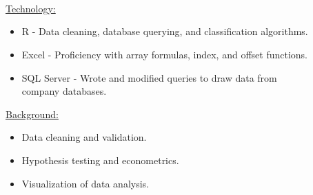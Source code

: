 \documentclass{res}
\begin{document}
\begin{resume}
\\



\\
\vspace{-5 pt}\\
\begin{minipage}{.5\textwidth} \normalsize{ \underline{ Technology:}    }
		
		\begin{minipage}{1\textwidth} 
			\begin{itemize}
			\item R - Data cleaning, database querying, and classification algorithms.
			\item Excel - Proficiency with array formulas, index, and offset functions.
			\item SQL Server - Wrote and modified queries to draw data from\\ company databases.
		\end{itemize}
		\end{minipage}
\end{minipage}
\begin{minipage}{1.25\textwidth} 
\normalsize{\underline{ Background:}}

		\begin{minipage}{.2\textwidth} 
			\begin{itemize}
			\item Data cleaning and validation.
			\item Hypothesis testing and econometrics.
			\item Visualization of data analysis.
		\end{itemize}
		\end{minipage}

\end{minipage} \\

\vspace{-20 pt}
\\

\newcommand{\jobdesc}[5]{
\begin{minipage}{\textwidth}	
	\begin{minipage}{.2\textwidth}
\vspace{#5 pt}
	\textit{#1}\\
	#2 \\
	#3
	\end{minipage}
	\begin{minipage}{.75\textwidth}
	#4
	\end{minipage}
\hphantom{f} \hspace{200 pt}\jobline
\end{minipage}
}



\end{resume}
\end{document}

